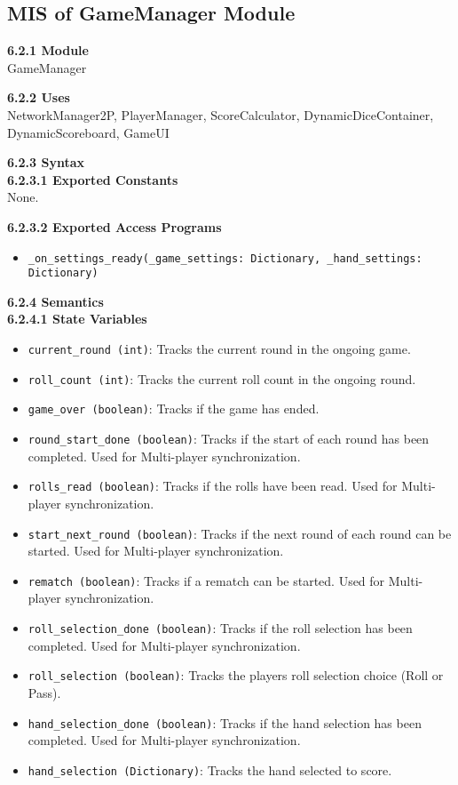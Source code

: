 \documentclass[12pt, titlepage]{article}
\begin{document}
\subsection{MIS of GameManager Module}\label{GameManager}
\textbf{6.2.1 Module}\\
GameManager

\textbf{6.2.2 Uses}\\
NetworkManager2P, PlayerManager, ScoreCalculator, DynamicDiceContainer, DynamicScoreboard, GameUI

\textbf{6.2.3 Syntax}\\
\textbf{6.2.3.1 Exported Constants}\\
None.  

\textbf{6.2.3.2 Exported Access Programs}
\begin{itemize}
    \item \texttt{\_on\_settings\_ready(\_game\_settings: Dictionary, \_hand\_settings: Dictionary)}
\end{itemize}

\textbf{6.2.4 Semantics}\\
\textbf{6.2.4.1 State Variables}\\
\begin{itemize}
    \item \texttt{current\_round (int)}: Tracks the current round in the ongoing game.
    \item \texttt{roll\_count (int)}: Tracks the current roll count in the ongoing round.
    \item \texttt{game\_over (boolean)}: Tracks if the game has ended.
    \item \texttt{round\_start\_done (boolean)}: Tracks if the start of each round has been completed. Used for Multi-player synchronization.
    \item \texttt{rolls\_read (boolean)}: Tracks if the rolls have been read. Used for Multi-player synchronization.
    \item \texttt{start\_next\_round (boolean)}: Tracks if the next round of each round can be started. Used for Multi-player synchronization.
    \item \texttt{rematch (boolean)}: Tracks if a rematch can be started. Used for Multi-player synchronization.
    \item \texttt{roll\_selection\_done (boolean)}: Tracks if the roll selection has been completed. Used for Multi-player synchronization.
    \item \texttt{roll\_selection (boolean)}: Tracks the players roll selection choice (Roll or Pass).
    \item \texttt{hand\_selection\_done (boolean)}: Tracks if the hand selection has been completed. Used for Multi-player synchronization.
    \item \texttt{hand\_selection (Dictionary)}: Tracks the hand selected to score.
\end{itemize}
\end{document}
